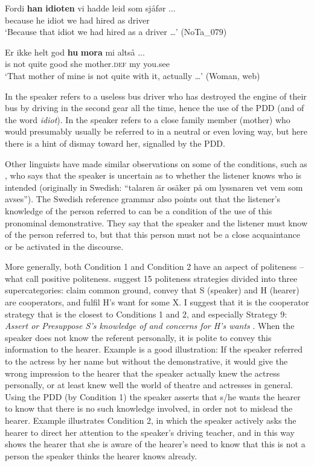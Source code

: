 \documentclass[output=paper,colorlinks,citecolor=brown]{langscibook}
\begin{document}
\ea\label{ex:johannessen:8}
 \gll Fordi \textbf{han} \textbf{idioten} vi hadde leid som sjåfør ...\\
     because he idiot we had hired as driver\\
\glt ‘Because that idiot we had hired as a driver …’\textbf{ }(NoTa\_079)
\z

\ea\label{ex:johannessen:9}
 \gll Er ikke helt god \textbf{hu} \textbf{mora} mi altså ... \\
     is not quite good she mother.\textsc{def} my you.see\\
\glt ‘That mother of mine is not quite with it, actually …’ (Woman, web)
\z

In  the speaker refers to a useless bus driver who has destroyed the engine of their bus by driving in the second gear all the time, hence the use of the PDD (and of the word \textit{idiot}). In  the speaker refers to a close family member (mother) who would presumably usually be referred to in a neutral or even loving way, but here there is a hint of dismay toward her, signalled by the PDD. 

Other linguists have made similar observations on some of the conditions, such as \citet[23]{Delsing2003}, who says that the speaker is uncertain as to whether the listener knows who is intended (originally in Swedish: “talaren är osäker på om lyssnaren vet vem som avses”). The Swedish reference grammar \citep[vol. 2: 274]{TelemanEtAl1999} also points out that the listener’s knowledge of the person referred to can be a condition of the use of this pronominal demonstrative. They say that the speaker and the listener must know of the person referred to, but that this person must not be a close acquaintance or be activated in the discourse.

More generally, both Condition 1 and Condition 2 have an aspect of politeness – what \citet{BrownLevinson1987} call positive politeness. \citet{BrownLevinson1987} suggest 15 politeness strategies divided into three supercategories: claim common ground, convey that S (speaker) and H (hearer) are cooperators, and fulfil H’s want for some X. I suggest that it is the cooperator strategy that is the closest to Conditions 1 and 2, and especially Strategy 9: \textit{Assert or Presuppose S’s knowledge of and concerns for H’s wants} \citep[125]{BrownLevinson1987}. When the speaker does not know the referent personally, it is polite to convey this information to the hearer. Example  is a good illustration: If the speaker referred to the actress by her name but without the demonstrative, it would give the wrong impression to the hearer that the speaker actually knew the actress personally, or at least knew well the world of theatre and actresses in general. Using the PDD (by Condition 1) the speaker asserts that s/he wants the hearer to know that there is no such knowledge involved, in order not to mislead the hearer. Example  illustrates Condition 2, in which the speaker actively asks the hearer to direct her attention to the speaker’s driving teacher, and in this way shows the hearer that she is aware of the hearer’s need to know that this is not a person the speaker thinks the hearer knows already.
\end{document}
